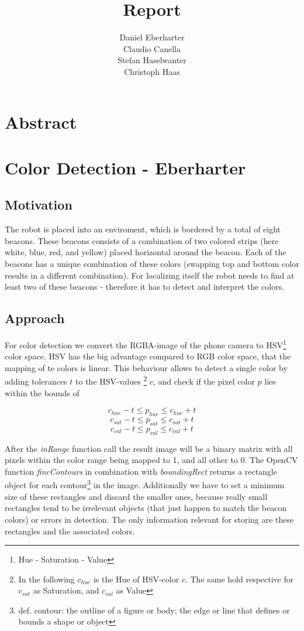 \documentclass[703031]{iisreport}
\title{Report}
\author{Daniel Eberharter\\ Claudio Canella\\ Stefan Haselwanter\\ Christoph Haas}
\begin{document}
\maketitle

\section{Abstract}


\section{Color Detection - Eberharter}
\subsection{Motivation}
The robot is placed into an enviroment, which is bordered by a total of eight beacons. These beacons consists of a combination of two colored strips (here white, blue, red, and yellow) placed horizontal around the beacon. Each of the beacons has a unique combination of these colors (swapping top and bottom color results in a different combination).
For localizing itself the robot needs to find at least two of these beacons - therefore it has to detect and interpret the colors.
\subsection{Approach}
For color detection we convert the RGBA-image of the phone camera to HSV\footnote{Hue - Saturation - Value} color space. HSV has the big advantage compared to RGB color space, that the mapping of te colors is linear. This behaviour allows to detect a single color by adding tolerances $t$ to the HSV-values \footnote{In the following $c_{hue}$ is the Hue of HSV-color $c$. The same hold respective for $c_{sat}$ as Saturation, and $c_{val}$ as Value} $c$, and check if the pixel color $p$ lies within the bounds of 

\[c_{hue} - t \le p_{hue} \le c_{hue} + t\]
\[c_{sat} - t \le p_{sat} \le c_{sat} + t\]
\[c_{val} - t \le p_{val} \le c_{val} + t\]

After the \emph{inRange} function call\cite{opencv_man_arrays} the result image will be a binary matrix with all pixels within the color range being mapped to 1, and all other to 0. The OpenCV function \emph{fincContours}\cite{opencv_man_struct_analysis} in combination with \emph{boundingRect}\cite{opencv_man_struct_analysis} returns a rectangle object for each contour\footnote{def. contour: the outline of a figure or body; the edge or line that defines or bounds a shape or object\cite{dict_contour}} in the image. Additionally we have to set a minimum size of these rectangles and discard the smaller ones, because really small rectangles tend to be irrelevant objects (that just happen to match the beacon colors) or errors in detection.
The only information relevant for storing are these rectangles and the associated colors. 
\end{document}
